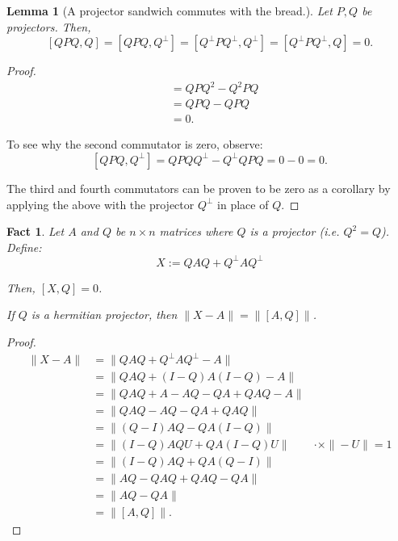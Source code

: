 \documentclass[12pt]{article}
\theoremstyle{plain}
\newtheorem{lemma}[theorem]{Lemma}
\newtheorem{fact}[theorem]{Fact}
\begin{document}
\begin{lemma}[A projector sandwich commutes with the bread.]
    Let $P, Q$ be projectors. Then,
    \[[QPQ, Q] = [QPQ, Q^\bot] = [Q^\bot P Q^\bot, Q^\bot] = [Q^\bot P Q^\bot, Q] = 0.\]
\end{lemma}
\begin{proof}
    \begin{align*}
        [QPQ, Q] &= QPQ^2 - Q^2PQ\\
        &= QPQ - QPQ\\
        &= 0.
    \end{align*}

\noindent To see why the second commutator is zero, observe:
\[
    [QPQ, Q^\bot] = QPQQ^\bot - Q^\bot QPQ = 0 - 0 = 0.
\]

\noindent The third and fourth commutators can be proven to be zero as a corollary by applying the above with the projector $Q^\bot$ in place of $Q$.
\end{proof}

\begin{fact}
    Let $A$ and $Q$ be $n \times n$ matrices where $Q$ is a projector (i.e. $Q^2 = Q$). Define:
    \begin{equation}
        X := QAQ + Q^\bot AQ^\bot
    \end{equation}
    
    \noindent Then, $[X, Q] = 0$.
    
    \noindent If $Q$ is a hermitian projector, then $\|X - A\| = \|[A,Q]\|$.
\end{fact}
\begin{proof}
    \begin{align*}
    \| X - A \| &= \| QAQ + Q^\bot A Q^\bot - A\|\\
    &= \| QAQ + (I-Q)A(I-Q) - A \|\\
    &= \| QAQ + A - AQ - QA + QAQ - A \|\\
    &= \| QAQ - AQ - QA + QAQ \|\\
    &= \|(Q - I)AQ - QA(I - Q) \|\\
    &= \|(I - Q)AQU + QA(I - Q) U \| & \cdot \times \|-U\| = 1\\
    &= \|(I - Q)AQ + QA(Q - I) \|\\
    &= \| AQ - QAQ + QAQ - QA\|\\
    &= \| AQ - QA\|\\
    &= \|[A, Q] \|.
\end{align*}
\end{proof}
\end{document}
